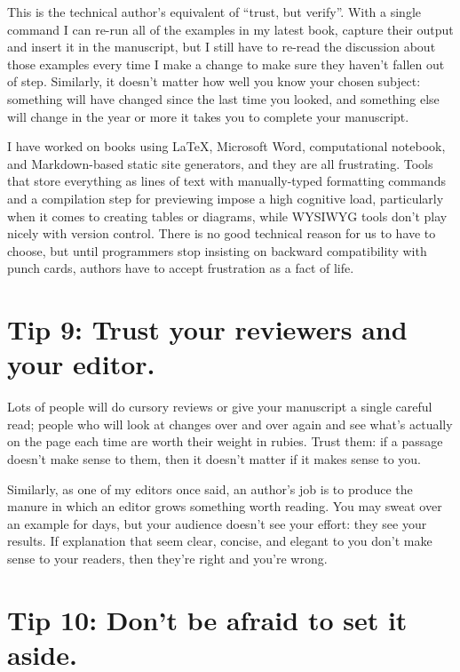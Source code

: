 \documentclass[10pt,letterpaper]{article}
\begin{document}
This is the technical author's equivalent of ``trust, but verify''.
With a single command I can re-run all of the examples in my latest book,
capture their output
and insert it in the manuscript,
but I still have to re-read the discussion about those examples every time I make a change
to make sure they haven't fallen out of step.
Similarly,
it doesn't matter how well you know your chosen subject:
something will have changed since the last time you looked,
and something else will change in the year or more it takes you to complete your manuscript.

\begin{mdframed}

I have worked on books using LaTeX, Microsoft Word, computational notebook,
and Markdown-based static site generators,
and they are all frustrating.
Tools that store everything as lines of text with manually-typed formatting commands
and a compilation step for previewing
impose a high cognitive load,
particularly when it comes to creating tables or diagrams,
while WYSIWYG tools don't play nicely with version control.
There is no good technical reason for us to have to choose,
but until programmers stop insisting on backward compatibility with punch cards,
authors have to accept frustration as a fact of life.

\end{mdframed}

\section*{Tip 9: Trust your reviewers and your editor.}

Lots of people will do cursory reviews
or give your manuscript a single careful read;
people who will look at changes over and over again
and see what's actually on the page each time
are worth their weight in rubies.
Trust them:
if a passage doesn't make sense to them,
then it doesn't matter if it makes sense to you.

Similarly,
as one of my editors once said,
an author's job is to produce the manure
in which an editor grows something worth reading.
You may sweat over an example for days,
but your audience doesn't see your effort:
they see your results.
If explanation that seem clear, concise, and elegant to you don't make sense to your readers,
then they're right and you're wrong.

\section*{Tip 10: Don't be afraid to set it aside.}
\end{document}
